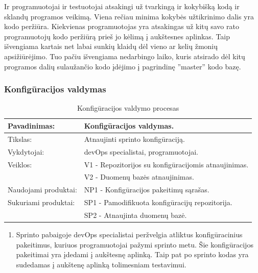 \documentclass{VUMIFPSkursinis}
\begin{document}
	\par Ir programuotojai ir testuotojai atsakingi už tvarkingą ir kokybišką kodą ir sklandų programos veikimą. Viena rečiau minima kokybės užtikrinimo dalis yra kodo peržiūra. Kiekvienas programuotojas yra atsakingas už kitų savo rato programuotojų kodo peržiūrą prieš jo kėlimą į aukštesnes aplinkas. Taip išvengiama kartais net labai sunkių klaidų dėl vieno ar kelių žmonių apsižiūrėjimo. Tuo pačiu išvengiama nedarbingo laiko, kuris atsirado dėl kitų programos dalių sulaužančio kodo įdėjimo į pagrindinę ''master'' kodo bazę.
	\subsubsection{Konfigūracijos valdymas}
	\begin{center}
		\begin{table}[ht]
		\caption{Konfigūracijos valdymo procesas}
		\begin{tabular}{ | l | l | } 
		\hline
		Pavadinimas:         & Konfigūracijos valdymas.                      \\ \hline
		Tikslas: 	           & Atnaujinti sprinto konfigūraciją.      \\ \hline
		Vykdytojai:          & devOps specialistai, programuotojai.                       \\ \hline
		Veiklos:             & V1 - Repozitorijos su konfigūracijomis atnaujinimas. 									  \\
						             & V2 - Duomenų bazės atnaujinimas. 							 \\ \hline
		Naudojami produktai: & NP1 - Konfigūracijos pakeitimų sąrašas.								 \\ \hline
		Sukuriami produktai: & SP1 - Pamodifikuota konfigūracijų repozitorija. 							  		\\
												 & SP2 - Atnaujinta duomenų bazė. 											 \\  \hline
		\end{tabular}
	\end{table}
		\end{center}
		\begin{enumerate}
			\item Sprinto pabaigoje devOps specialistai peržvelgia atliktus konfigūracinius pakeitimus, kuriuos programuotojai pažymi sprinto metu. Šie konfigūracijos pakeitimai yra įdedami į aukštesnę aplinką. Taip pat po sprinto kodas yra sudedamas į aukštenę aplinką tolimesniam testavimui.
		\end{enumerate}
\end{document}
